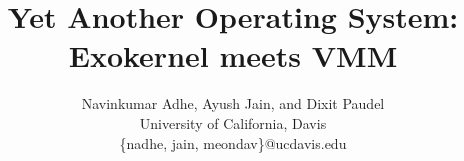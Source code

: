 \documentclass[letterpaper,twocolumn,10pt]{article}
\date{}
\begin{document}
\title{Yet Another Operating System: Exokernel meets VMM}
\author{Navinkumar Adhe, Ayush Jain, and Dixit Paudel\\
University of California, Davis\\
\{nadhe, jain, meondav\}@ucdavis.edu}
\maketitle






\end{document}
